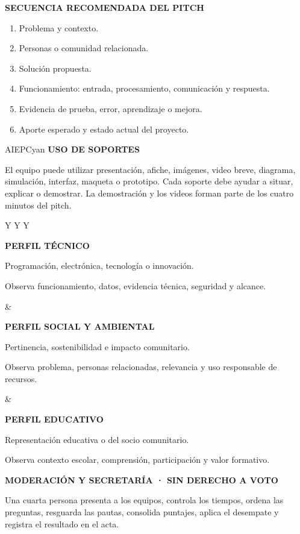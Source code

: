 \documentclass[10pt,a4paper]{article}
\newcommand{\labeltext}[1]{%
  {\scriptsize\bfseries\color{AIEPSlate}\MakeUppercase{#1}}\par\vspace{1.2mm}
}
\begin{document}
\begin{card}
\labeltext{Secuencia recomendada del pitch}
\begin{enumerate}
  \item Problema y contexto.
  \item Personas o comunidad relacionada.
  \item Solución propuesta.
  \item Funcionamiento: entrada, procesamiento, comunicación y respuesta.
  \item Evidencia de prueba, error, aprendizaje o mejora.
  \item Aporte esperado y estado actual del proyecto.
\end{enumerate}
\end{card}

\begin{softcard}{AIEPCyan}
\labeltext{Uso de soportes}
El equipo puede utilizar presentación, afiche, imágenes, video breve, diagrama, simulación,
interfaz, maqueta o prototipo. Cada soporte debe ayudar a situar, explicar o demostrar. La
demostración y los videos forman parte de los cuatro minutos del pitch.
\end{softcard}

\begin{tabularx}{\textwidth}{Y Y Y}
\begin{card}[height=58mm,valign=top]
\labeltext{Perfil técnico}
Programación, electrónica, tecnología o innovación.\par
\vspace{3mm}
Observa funcionamiento, datos, evidencia técnica, seguridad y alcance.
\end{card}
&
\begin{card}[height=58mm,valign=top]
\labeltext{Perfil social y ambiental}
Pertinencia, sostenibilidad e impacto comunitario.\par
\vspace{3mm}
Observa problema, personas relacionadas, relevancia y uso responsable de recursos.
\end{card}
&
\begin{card}[height=58mm,valign=top]
\labeltext{Perfil educativo}
Representación educativa o del socio comunitario.\par
\vspace{3mm}
Observa contexto escolar, comprensión, participación y valor formativo.
\end{card}
\end{tabularx}

\begin{card}
\labeltext{Moderación y secretaría · sin derecho a voto}
Una cuarta persona presenta a los equipos, controla los tiempos, ordena las preguntas, resguarda
las pautas, consolida puntajes, aplica el desempate y registra el resultado en el acta.
\end{card}
\end{document}
